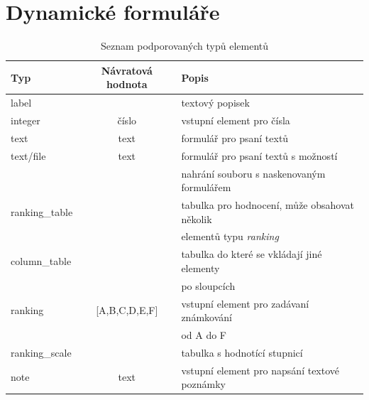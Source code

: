 \chapter{Dynamické formuláře}
\begin{table}[h]
\begin{center}
\begin{tabular}{|l|c|l|}

\hline
\textbf{Typ} & \textbf{Návratová hodnota} & \textbf{Popis} \\ \hline
label &  & textový popisek \\\hline
integer & číslo & vstupní element pro čísla \\ \hline
text & text & formulář pro psaní textů \\\hline
text/file & text & formulář pro psaní textů s možností \\ & &  nahrání souboru s naskenovaným formulářem \\\hline
ranking\_table &  & tabulka pro hodnocení, může obsahovat několik \\ & & elementů typu \textit{ranking} \\\hline
column\_table & & tabulka do které se vkládají jiné elementy \\ & &  po sloupcích \\\hline
ranking & [A,B,C,D,E,F] & vstupní element pro zadávaní známkování  \\ & &   od A do F \\\hline
ranking\_scale & & tabulka s hodnotící stupnicí \\\hline
note & text & vstupní element pro napsání textové poznámky \\\hline

\end{tabular}
\caption{Seznam podporovaných typů elementů}
\label{tab:elements}
\end{center}
\end{table}

